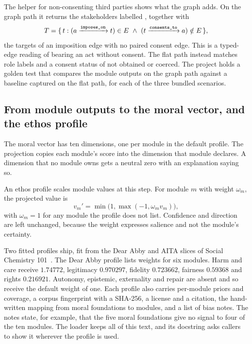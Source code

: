 The helper for non-consenting third parties shows what the graph adds. On the graph path it
returns the stakeholders labelled , together with
\begin{equation}
T = \{\, t : (a \xrightarrow{\texttt{imposes\_on}} t) \in E \ \wedge\ (t \xrightarrow{\texttt{consents\_to}} a) \notin E \,\},
\label{eq:compiler-thirdparty}
\end{equation}
the targets of an imposition edge with no paired consent edge. This is a typed-edge reading of
bearing an act without consent. The flat path instead matches role labels and a consent status of
not obtained or coerced. The project holds a golden test that compares the module outputs on the
graph path against a baseline captured on the flat path, for each of the three bundled scenarios.

\subsection{From module outputs to the moral vector, and the ethos profile}

The moral vector has ten dimensions, one per module in the default profile. The projection copies
each module's score into the dimension that module declares. A dimension that no module owns gets
a neutral zero with an explanation saying so.

An ethos profile scales module values at this step. For module $m$ with weight $\omega_m$, the
projected value is
\begin{equation}
v_m' = \min\bigl(1, \max(-1, \omega_m v_m)\bigr),
\label{eq:compiler-ethos}
\end{equation}
with $\omega_m = 1$ for any module the profile does not list. Confidence and direction are left
unchanged, because the weight expresses salience and not the module's certainty.

Two fitted profiles ship, fit from the Dear Abby and AITA slices of Social Chemistry
101~\cite{forbes2020socialchem}. The Dear Abby profile lists weights for six modules. Harm and care
receive $1.74772$, legitimacy $0.970297$, fidelity $0.723662$, fairness $0.59368$ and rights
$0.216921$. Autonomy, epistemic, externality and repair are absent and so receive the default
weight of one. Each profile also carries per-module priors and coverage, a corpus fingerprint with
a SHA-256, a license and a citation, the hand-written mapping from moral foundations to modules,
and a list of bias notes. The notes state, for example, that the five moral foundations give no
signal to four of the ten modules. The loader keeps all of this text, and its docstring asks
callers to show it wherever the profile is used.

